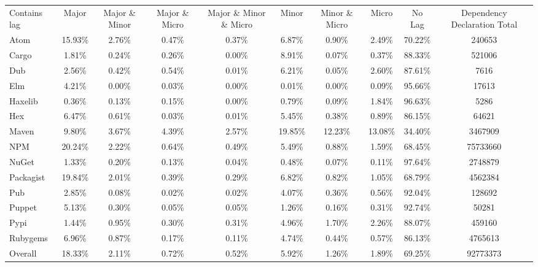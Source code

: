 \begin{tabular}{|l|ccccccc|c|c|}
\hline
\multirow{3}{*}{Contains lag} & \multirow{3}{*}{Major} & \multirow{3}{*}{Major \& Minor} & \multirow{3}{*}{Major \& Micro} & \multirow{3}{*}{Major \& Minor \& Micro} & \multirow{3}{*}{Minor} & \multirow{3}{*}{Minor \& Micro} & \multirow{3}{*}{Micro} & \multirow{3}{*}{No Lag} & \multirow{3}{*}{Dependency Declaration Total} \\
 & & & & & & & & & \\
 & & & & & & & & & \\
\hline
Atom & 15.93\% & 2.76\% & 0.47\% & 0.37\% & 6.87\% & 0.90\% & 2.49\% & 70.22\% & 240653 \\
Cargo & 1.81\% & 0.24\% & 0.26\% & 0.00\% & 8.91\% & 0.07\% & 0.37\% & 88.33\% & 521006 \\
Dub & 2.56\% & 0.42\% & 0.54\% & 0.01\% & 6.21\% & 0.05\% & 2.60\% & 87.61\% & 7616 \\
Elm & 4.21\% & 0.00\% & 0.03\% & 0.00\% & 0.01\% & 0.00\% & 0.09\% & 95.66\% & 17613 \\
Haxelib & 0.36\% & 0.13\% & 0.15\% & 0.00\% & 0.79\% & 0.09\% & 1.84\% & 96.63\% & 5286 \\
Hex & 6.47\% & 0.61\% & 0.03\% & 0.01\% & 5.45\% & 0.38\% & 0.89\% & 86.15\% & 64621 \\
Maven & 9.80\% & 3.67\% & 4.39\% & 2.57\% & 19.85\% & 12.23\% & 13.08\% & 34.40\% & 3467909 \\
NPM & 20.24\% & 2.22\% & 0.64\% & 0.49\% & 5.49\% & 0.88\% & 1.59\% & 68.45\% & 75733660 \\
NuGet & 1.33\% & 0.20\% & 0.13\% & 0.04\% & 0.48\% & 0.07\% & 0.11\% & 97.64\% & 2748879 \\
Packagist & 19.84\% & 2.01\% & 0.39\% & 0.29\% & 6.82\% & 0.82\% & 1.05\% & 68.79\% & 4562384 \\
Pub & 2.85\% & 0.08\% & 0.02\% & 0.02\% & 4.07\% & 0.36\% & 0.56\% & 92.04\% & 128692 \\
Puppet & 5.13\% & 0.30\% & 0.05\% & 0.05\% & 1.26\% & 0.16\% & 0.31\% & 92.74\% & 50281 \\
Pypi & 1.44\% & 0.95\% & 0.30\% & 0.31\% & 4.96\% & 1.70\% & 2.26\% & 88.07\% & 459160 \\
Rubygems & 6.96\% & 0.87\% & 0.17\% & 0.11\% & 4.74\% & 0.44\% & 0.57\% & 86.13\% & 4765613 \\
Overall & 18.33\% & 2.11\% & 0.72\% & 0.52\% & 5.92\% & 1.26\% & 1.89\% & 69.25\% & 92773373 \\
\hline
\end{tabular}
